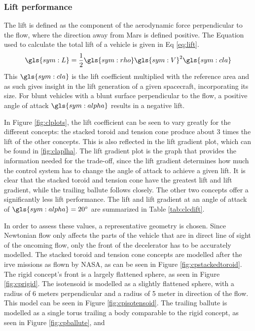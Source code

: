 \subsubsection{Lift performance}
The lift is defined as the component of the aerodynamic force perpendicular to the flow, where the direction away from Mars is defined positive. The Equation used to calculate the total lift of a vehicle is given in Eq \ref{eq:lift}.
\begin{equation}
\gls{sym:L} = \frac{1}{2}\gls{sym:rho}\gls{sym:V}^2\gls{sym:cla}
\label{eq:lift}
\end{equation}
This $\gls{sym:cla}$ is the lift coefficient multiplied with the reference area and as such gives insight in the lift generation of a given spacecraft, incorporating its size. For blunt vehicles with a blunt surface perpendicular to the flow, a positive angle of attack $\gls{sym:alpha}$ results in a negative lift.

In Figure \ref{fig:clplots}, the lift coefficient can be seen to vary greatly for the different concepts: the stacked toroid and tension cone produce about 3 times the lift of the other concepts. This is also reflected in the lift gradient plot, which can be found in \ref{fig:claplha}. The lift gradient plot is the graph that provides the information needed for the trade-off, since the lift gradient determines how much the control system has to change the angle of attack to achieve a given lift. It is clear that the stacked toroid and tension cone have the greatest lift and lift gradient, while the trailing ballute follows closely. The other two concepts offer a significantly less lift performance. The lift and lift gradient at an angle of attack of $\gls{sym:alpha}=20^\circ$ are summarized in Table \ref{tab:clcdift}.

In order to assess these values, a representative geometry is chosen. Since Newtonian flow only affects the parts of the vehicle that are in direct line of sight of the oncoming flow, only the front of the decelerator has to be accurately modelled. The stacked toroid and tension cone concepts are modelled after the \gls{irve} missions as flown by NASA, as can be seen in Figure \ref{fig:cpstackedtoroid}. The rigid concept's front is a largely flattened sphere, as seen in Figure \ref{fig:cprigid}. The isotensoid is modelled as a slightly flattened sphere, with a radius of 6 meters perpendicular and a radius of 5 meter in direction of the flow. This model can be seen in Figure \ref{fig:cpisotensoid}. The trailing ballute is modelled as a single torus trailing a body comparable to the rigid concept, as seen in Figure \ref{fig:cpballute}, and 



